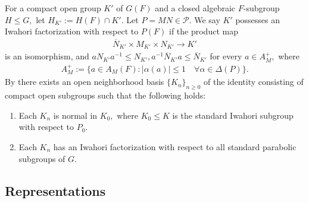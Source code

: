 \documentclass[10pt]{amsart}
\newtheorem{lemma}[theorem]{Lemma}
\theoremstyle{definition}
\numberwithin{equation}{section}
\numberwithin{equation}{subsection}
\begin{document}

 For a compact open group $K'$ of $G(F)$ and a closed algebraic $F$-subgroup $H\le G,$ let $H_{K'}:=H(F)\cap K'.$ Let $P=MN\in \mathcal{P}$. We say $K'$ possesses an Iwahori factorization with respect to $P(F)$ if the product map
\begin{align*}
    \overline{N}_{K'}\times M_{K'} \times N_{K'}\longrightarrow K'
\end{align*}
is an isomorphism, and $ aN_{K'}a^{-1}\le N_{K'}, a^{-1} \overline{N}_{K'}a\le  \overline{N}_{K'}$ for every $a\in A_{M}^+,$ where
\begin{align*}
    A_{M}^+:=\{a\in A_M(F): |\alpha(a)|\le 1 \quad\forall \alpha\in \Delta(P)\}.
\end{align*}
By \cite[Proposition 1.4.4]{Casselman1995} there exists an open neighborhood basis $\{K_n\}_{n\ge 0}$ of the identity consisting of compact open subgroups such that the following holds: 
\begin{enumerate}
    \item Each $K_n$ is normal in $K_0,$ where $K_0\le K$ is the standard Iwahori subgroup with respect to $P_0$.
    \item Each $K_n$ has an Iwahori factorization with respect to all standard parabolic subgroups of $G$.
\end{enumerate}

\subsection{Representations} 
\end{document}
